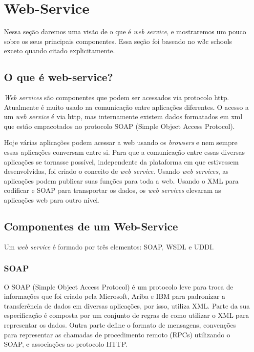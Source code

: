 \section{Web-Service}


Nessa seção daremos uma visão de o que é \textit{web service}, e mostraremos um pouco sobre os seus principais componentes. Essa seção foi baseado no w3c schools ~\cite{w3cs} exceto quando citado explicitamente.

\subsection{O que é web-service?}

\textit{Web services} são componentes que podem ser acessados via protocolo http. Atualmente é muito usado na comunicação entre aplicações diferentes. O acesso a um \textit{web service} é via http, mas internamente existem dados formatados em xml que estão empacotados no protocolo SOAP (Simple Object Access Protocol).

Hoje várias aplicações podem acessar a web usando os \textit{browsers} e nem sempre essas aplicações conversam entre si. Para que a comunicação entre essas diversas aplicações se tornasse possível, independente da plataforma em que estivessem desenvolvidas, foi criado o conceito de \textit{web service}. Usando \textit{web services}, as aplicações podem publicar suas funções para toda a web. Usando o XML para codificar e SOAP para transportar os dados, os \textit{web services} elevaram as aplicações web para outro nível.

\subsection{Componentes de um Web-Service}

Um \textit{web service} é formado por três elementos: SOAP, WSDL e UDDI.

\subsubsection{SOAP}


O SOAP (Simple Object Access Protocol) é um protocolo leve para troca de informações que foi criado pela Microsoft, Ariba e IBM para padronizar a transferência de dados em diversas aplicações, por isso, utiliza XML. Parte da sua especificação é composta por um conjunto de regras de como utilizar o XML para representar os dados. Outra parte define o formato de mensagens, convenções para representar as chamadas de procedimento remoto (RPCs) utilizando o SOAP, e associações ao protocolo HTTP. 

